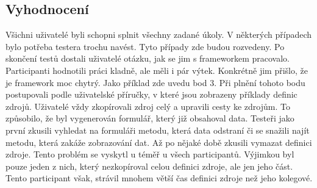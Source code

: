 \subsection{Vyhodnocení}
Všichni uživatelé byli schopni splnit všechny zadané úkoly. V některých případech bylo potřeba testera trochu navést. Tyto případy zde budou rozvedeny. Po skončení testů dostali uživatelé otázku, jak se jim s frameworkem pracovalo. Participanti hodnotili práci kladně, ale měli i pár výtek. Konkrétně jim přišlo, že je framework moc chytrý. Jako příklad zde uvedu bod 3. Při plnění tohoto bodu postupovali podle uživatelské příručky, v které jsou zobrazeny příklady definic zdrojů. Uživatelé vždy zkopírovali zdroj celý a upravili cesty ke zdrojům. To způsobilo, že byl vygenerován formulář, který již obsahoval data. Testeři jako první zkusili vyhledat na formuláři metodu, která data odstraní či se snažili najít metodu, která zakáže zobrazování dat. Až po nějaké době zkusili vymazat definici zdroje. Tento problém se vyskytl u téměř u všech participantů. Výjimkou byl pouze jeden z nich, který nezkopíroval celou definici zdroje, ale jen jeho část. Tento participant však, strávil mnohem větší čas definici zdroje než jeho kolegové.

